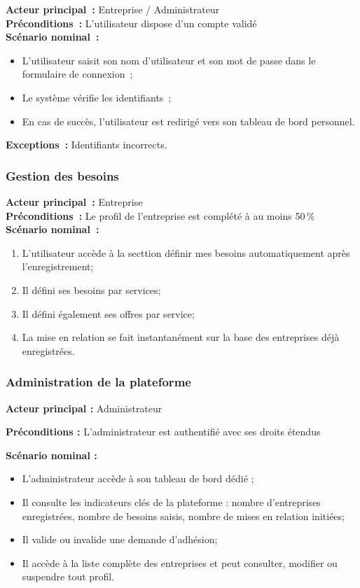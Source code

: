 \documentclass[12pt, a4paper, oneside]{report}
\begin{document}
		\textbf{Acteur principal~:} Entreprise / Administrateur \\
		\textbf{Préconditions~:} L'utilisateur dispose d'un compte validé \\
		\textbf{Scénario nominal~:}
		\begin{itemize}
			\item L'utilisateur saisit son nom d'utilisateur et son
			mot de passe dans le formulaire de connexion~;
			\item Le système vérifie les identifiants~;
			\item En cas de succès, l'utilisateur est redirigé vers son
			tableau de bord personnel.
		\end{itemize}
		\textbf{Exceptions~:} Identifiants incorrects.

	
	\subsubsection{Gestion des besoins}
	
		\textbf{Acteur principal~:} Entreprise \\
		\textbf{Préconditions~:} Le profil de l'entreprise est complété
		à au moins 50\,\% \\
		\textbf{Scénario nominal~:}
		\begin{enumerate}
			\item L'utilisateur accède à la secttion définir mes besoins automatiquement après l'enregistrement;
			\item Il défini ses besoins par services;
			\item Il défini également ses offres par service;
			\item La mise en relation se fait instantanément sur la base des entreprises déjà enregistrées.
		\end{enumerate}
		
\subsubsection{Administration de la plateforme}
	

	\textbf{Acteur principal :} Administrateur \par\smallskip
	\textbf{Préconditions :} L'administrateur est authentifié avec ses droits étendus \par\smallskip
	\textbf{Scénario nominal :}
	\begin{itemize}
		\item L'administrateur accède à son tableau de bord dédié ;
		\item Il consulte les indicateurs clés de la plateforme :
		nombre d'entreprises enregistrées, nombre de besoins
		saisis, nombre de mises en relation initiées;
		\item Il valide ou invalide une demande d'adhésion;
		\item Il accède à la liste complète des entreprises et peut
		consulter, modifier ou suspendre tout profil.
	\end{itemize}
\end{document}
